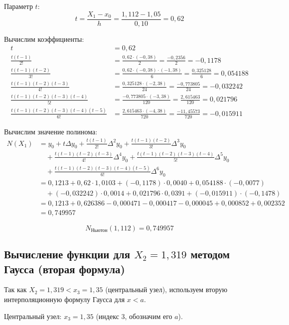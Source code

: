 Параметр $t$:
\[
t = \frac{X_1 - x_0}{h} = \frac{1{,}112 - 1{,}05}{0{,}10} = 0{,}62
\]

Вычислим коэффициенты:
\begin{align*}
t &= 0{,}62 \\
\frac{t(t-1)}{2!} &= \frac{0{,}62 \cdot (-0{,}38)}{2} = \frac{-0{,}2356}{2} = -0{,}1178 \\
\frac{t(t-1)(t-2)}{3!} &= \frac{0{,}62 \cdot (-0{,}38) \cdot (-1{,}38)}{6} = \frac{0{,}325128}{6} = 0{,}054188 \\
\frac{t(t-1)(t-2)(t-3)}{4!} &= \frac{0{,}325128 \cdot (-2{,}38)}{24} = \frac{-0{,}773805}{24} = -0{,}032242 \\
\frac{t(t-1)(t-2)(t-3)(t-4)}{5!} &= \frac{-0{,}773805 \cdot (-3{,}38)}{120} = \frac{2{,}615463}{120} = 0{,}021796 \\
\frac{t(t-1)(t-2)(t-3)(t-4)(t-5)}{6!} &= \frac{2{,}615463 \cdot (-4{,}38)}{720} = \frac{-11{,}45573}{720} = -0{,}015911
\end{align*}

Вычислим значение полинома:
\begin{align*}
N(X_1) &= y_0 + t\Delta y_0 + \frac{t(t-1)}{2!}\Delta^2 y_0 + \frac{t(t-1)(t-2)}{3!}\Delta^3 y_0 \\
&\quad + \frac{t(t-1)(t-2)(t-3)}{4!}\Delta^4 y_0 + \frac{t(t-1)(t-2)(t-3)(t-4)}{5!}\Delta^5 y_0 \\
&\quad + \frac{t(t-1)(t-2)(t-3)(t-4)(t-5)}{6!}\Delta^6 y_0 \\
&= 0{,}1213 + 0{,}62 \cdot 1{,}0103 + (-0{,}1178) \cdot 0{,}0040 + 0{,}054188 \cdot (-0{,}0077) \\
&\quad + (-0{,}032242) \cdot 0{,}0014 + 0{,}021796 \cdot 0{,}0391 + (-0{,}015911) \cdot (-0{,}1478) \\
&= 0{,}1213 + 0{,}626386 - 0{,}000471 - 0{,}000417 - 0{,}000045 + 0{,}000852 + 0{,}002352 \\
&= 0{,}749957
\end{align*}

\[
\boxed{N_{\text{Ньютон}}(1{,}112) = 0{,}749957}
\]

\subsection{Вычисление функции для $X_2 = 1{,}319$ методом Гаусса (вторая формула)}

Так как $X_2 = 1{,}319 < x_3 = 1{,}35$ (центральный узел), используем вторую интерполяционную формулу Гаусса для $x < a$.

Центральный узел: $x_3 = 1{,}35$ (индекс 3, обозначим его $a$).

